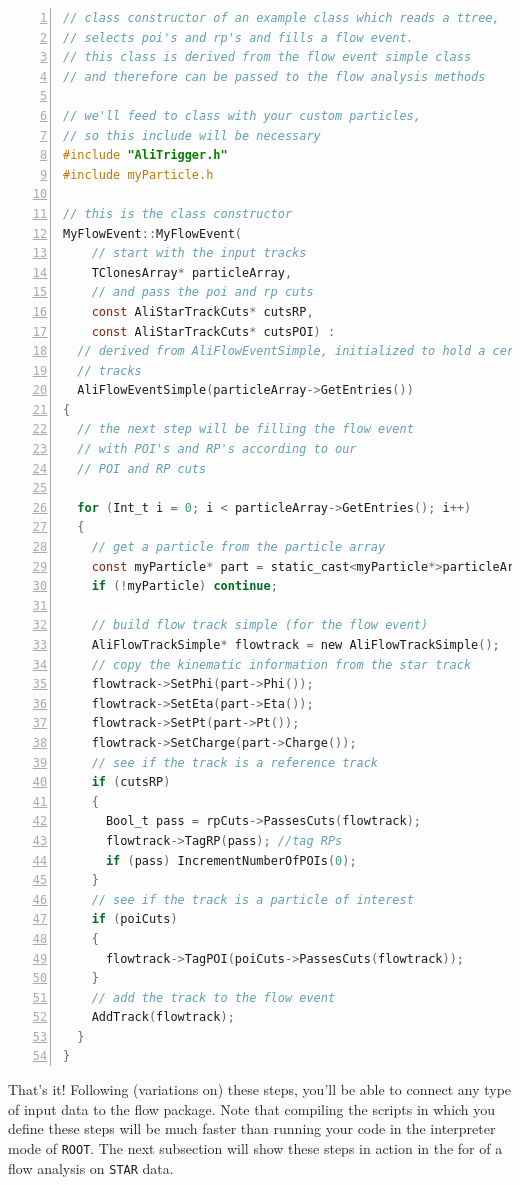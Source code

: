 \documentclass[a4paper]{book}
\numberwithin{equation}{subsection}
\begin{document}
\begin{lstlisting}[language=C, numbers=left]
// class constructor of an example class which reads a ttree, 
// selects poi's and rp's and fills a flow event. 
// this class is derived from the flow event simple class
// and therefore can be passed to the flow analysis methods

// we'll feed to class with your custom particles, 
// so this include will be necessary
#include "AliTrigger.h"
#include myParticle.h

// this is the class constructor
MyFlowEvent::MyFlowEvent(
    // start with the input tracks
    TClonesArray* particleArray,
    // and pass the poi and rp cuts
    const AliStarTrackCuts* cutsRP,
    const AliStarTrackCuts* cutsPOI) :
  // derived from AliFlowEventSimple, initialized to hold a certain number of 
  // tracks
  AliFlowEventSimple(particleArray->GetEntries())
{
  // the next step will be filling the flow event
  // with POI's and RP's according to our 
  // POI and RP cuts  
  
  for (Int_t i = 0; i < particleArray->GetEntries(); i++)
  {
    // get a particle from the particle array
    const myParticle* part = static_cast<myParticle*>particleArray->At(i);
    if (!myParticle) continue;
    
    // build flow track simple (for the flow event)
    AliFlowTrackSimple* flowtrack = new AliFlowTrackSimple();
    // copy the kinematic information from the star track
    flowtrack->SetPhi(part->Phi());
    flowtrack->SetEta(part->Eta());
    flowtrack->SetPt(part->Pt());
    flowtrack->SetCharge(part->Charge());
    // see if the track is a reference track
    if (cutsRP)
    {
      Bool_t pass = rpCuts->PassesCuts(flowtrack);
      flowtrack->TagRP(pass); //tag RPs
      if (pass) IncrementNumberOfPOIs(0);
    }
    // see if the track is a particle of interest
    if (poiCuts)
    {
      flowtrack->TagPOI(poiCuts->PassesCuts(flowtrack));
    }
    // add the track to the flow event
    AddTrack(flowtrack);
  }
}\end{lstlisting}
That's it! Following (variations on) these steps, you'll be able to connect any type of input data to the flow package. Note that compiling the scripts in which you define these steps will be much faster than running your code in the interpreter mode of \texttt{ROOT}. The next subsection will show these steps in action in the for of a flow analysis on \texttt{STAR} data.
\end{document}

